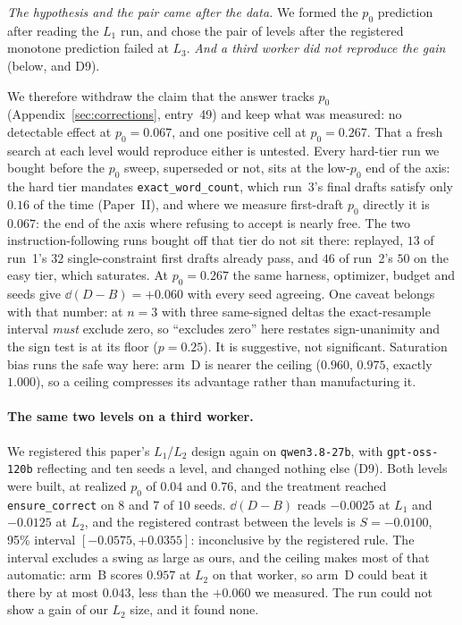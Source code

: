 \documentclass[11pt]{article}
\begin{document}
\emph{The hypothesis and the pair came after the data.} We formed the $p_0$ prediction after
reading the $L_1$ run, and chose the pair of levels after the registered monotone prediction
failed at $L_3$. \emph{And a third worker did not reproduce the gain} (below, and D9).

We therefore withdraw the claim that the answer tracks $p_0$ (Appendix~\ref{sec:corrections},
entry~49) and keep what was measured: no detectable effect at $p_0 = 0.067$, and one positive
cell at $p_0 = 0.267$. That a fresh search at each level would reproduce either is untested.
Every hard-tier run we bought before the $p_0$ sweep, superseded or not, sits at the
low-$p_0$ end of the axis: the hard tier mandates \texttt{exact\_word\_count}, which run~3's
final drafts satisfy only $0.16$ of the time (Paper~II), and where we measure first-draft $p_0$
directly it is $0.067$: the end of the axis
where refusing to accept is nearly free. The two instruction-following runs bought off that tier
do not sit there: replayed, $13$ of run~1's $32$ single-constraint first drafts already pass, and
$46$ of run~2's $50$ on the easy tier, which saturates. At $p_0 = 0.267$ the same harness, optimizer, budget and
seeds give $\dd(D-B) = +0.060$ with every seed agreeing. One caveat belongs with that number: at
$n=3$ with three same-signed deltas the exact-resample interval \emph{must} exclude zero, so
``excludes zero'' here restates sign-unanimity and the sign test is at its floor ($p = 0.25$). It
is suggestive, not significant. Saturation bias runs the safe way here:
arm~D is nearer the ceiling ($0.960$, $0.975$, exactly $1.000$), so a ceiling compresses its
advantage rather than manufacturing it.

\paragraph{The same two levels on a third worker.} We registered this paper's $L_1$/$L_2$ design
again on \texttt{qwen3.8-27b}, with \texttt{gpt-oss-120b} reflecting and ten seeds a level, and
changed nothing else (D9). Both levels were built, at realized $p_0$ of $0.04$ and $0.76$, and the
treatment reached \texttt{ensure\_correct} on $8$ and $7$ of $10$ seeds. $\dd(D-B)$ reads
$-0.0025$ at $L_1$ and $-0.0125$ at $L_2$, and the registered contrast between the levels is
$S = -0.0100$, 95\% interval $[-0.0575, +0.0355]$: inconclusive by the registered rule. The
interval excludes a swing as large as ours, and the ceiling makes most of that automatic: arm~B scores $0.957$ at
$L_2$ on that worker, so arm~D could beat it there by at most $0.043$, less than the $+0.060$ we
measured. The run could not show a gain of our $L_2$ size, and it found none.
\end{document}
